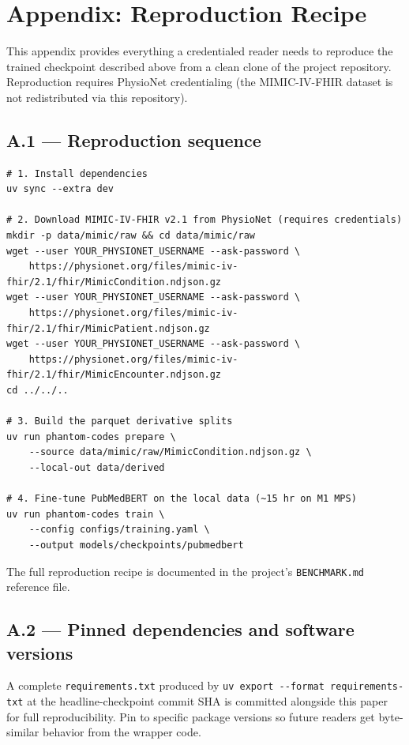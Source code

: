 \section{Appendix: Reproduction Recipe}\label{appendix-reproduction-recipe}

This appendix provides everything a credentialed reader needs to
reproduce the trained checkpoint described above from a clean clone
of the project repository. Reproduction requires PhysioNet
credentialing (the MIMIC-IV-FHIR dataset is not redistributed via
this repository).

\subsection{A.1 --- Reproduction sequence}\label{a.1-reproduction-sequence}

\begin{verbatim}
# 1. Install dependencies
uv sync --extra dev

# 2. Download MIMIC-IV-FHIR v2.1 from PhysioNet (requires credentials)
mkdir -p data/mimic/raw && cd data/mimic/raw
wget --user YOUR_PHYSIONET_USERNAME --ask-password \
    https://physionet.org/files/mimic-iv-fhir/2.1/fhir/MimicCondition.ndjson.gz
wget --user YOUR_PHYSIONET_USERNAME --ask-password \
    https://physionet.org/files/mimic-iv-fhir/2.1/fhir/MimicPatient.ndjson.gz
wget --user YOUR_PHYSIONET_USERNAME --ask-password \
    https://physionet.org/files/mimic-iv-fhir/2.1/fhir/MimicEncounter.ndjson.gz
cd ../../..

# 3. Build the parquet derivative splits
uv run phantom-codes prepare \
    --source data/mimic/raw/MimicCondition.ndjson.gz \
    --local-out data/derived

# 4. Fine-tune PubMedBERT on the local data (~15 hr on M1 MPS)
uv run phantom-codes train \
    --config configs/training.yaml \
    --output models/checkpoints/pubmedbert
\end{verbatim}

The full reproduction recipe is documented in the project's
\texttt{BENCHMARK.md} reference file.

\subsection{A.2 --- Pinned dependencies and software versions}\label{a.2-pinned-dependencies-and-software-versions}

A complete \texttt{requirements.txt} produced by \texttt{uv\ export\ -\/-format\ requirements-txt} at the headline-checkpoint commit SHA
is committed alongside this paper for full reproducibility. Pin to
specific package versions so future readers get byte-similar
behavior from the wrapper code.

